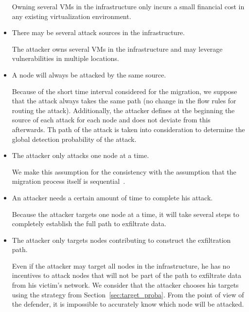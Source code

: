 \begin{itemize}
     Owning several VMs in the infrastructure only incurs a small financial cost in any existing virtualization environment.
 
    
    \item There may be several attack sources in the infrastructure.
    
    The attacker owns several VMs in the infrastructure and may leverage vulnerabilities in multiple locations.
    
    \item A node will always be attacked by the same source.
    
    Because of the short time interval considered for the migration, we suppose that the attack always takes the same path (\ie no change in the flow rules for routing the attack).
    Additionally, the attacker defines at the beginning the source of each attack for each node and does not deviate from this afterwards.
    Th path of the attack is taken into consideration to determine the global detection probability of the attack.
    
    \item The attacker only attacks one node at a time.
    
    We make this assumption for the consistency with the assumption that the migration process itself is sequential~\cite{Lime-Ghorbani2014}.
    
    
    \item An attacker needs a certain amount of time to complete his attack.
    
    Because the attacker targets one node at a time, it will take several steps to completely establish the full path to exfiltrate data. 
    
    \item The attacker only targets nodes contributing to construct the exfiltration path.
    
     Even if the attacker may target all nodes in the infrastructure, he has no incentives to attack nodes that will not be part of the path to exfiltrate data from his victim's network. We consider that the attacker chooses his targets using the strategy from Section~\ref{sec:target_proba}.
    From the point of view of the defender, it is impossible to accurately know which node will be attacked.
    
\end{itemize}




